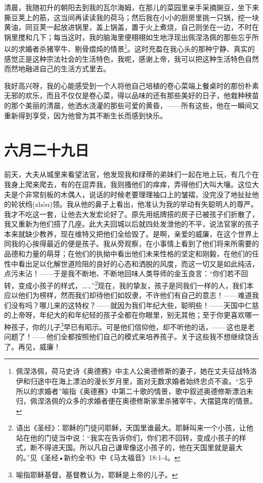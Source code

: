 \documentclass[12pt,oneside]{book}
\begin{document}
清晨，我随初升的朝阳去到我的瓦尔海姆，在那儿的菜园里亲手采摘豌豆，坐下来撕豆荚上的筋，这当间再读读我的荷马；然后我在小小的厨房里挑一只锅，挖一块黄油，同豆荚一起放进锅里，盖上锅盖，置于火上煮烧，自己则坐在一边，不时在锅里搅和几下；每当这时，我的脑海里便栩栩如生地浮现出佩涅洛佩的那些忘乎所以的求婚者杀猪宰牛、剔骨煨炖的情景\footnote{佩涅洛佩，荷马史诗《奥德赛》中主人公奥德修斯的妻子，她在丈夫征战特洛伊和归途中在海上漂泊的漫长岁月里，面对无数求婚者始终忠贞不渝。“忘乎所以的求婚者”喻指《奥德赛》中第二十歌的情景，歌中叙述奥德修斯漂泊未归，佩涅洛佩的众多的求婚者便在奥德修斯家里杀猪宰牛，大摆筵席的情景。}。这时充盈在我心头的那种宁静、真实的感觉正是这种宗法社会的生活特色，我呢，感谢上帝，我可以把这种生活特色自然而然地融进自己的生活方式里去。

我好高兴呀，我的心能感受到一个人将他自己培植的卷心菜端上餐桌时的那份朴素无邪的欢乐，而且不仅仅是卷心菜，得以品味的还有那些美好的日子，他栽种秧苗的那个美丽的清晨，他洒水浇灌的那些可爱的黄昏，——所有这些，他在一瞬间又重新得到享受，因为他曾为其不断生长而感到快乐。

\chapter{六月二十九日}
前天，大夫从城里来看望法官，他发现我和绿蒂的弟妹们一起在地上玩，有几个在我身上爬来爬去，有的在逗弄我，我则搔他们的痒痒，弄得他们大叫大嚷。这位大夫是个非常刻板的木偶人，说话的时候老要理理袖口上的皱褶，没完没了地扯扯他的轮状绉(zhòu)领。我从他的鼻子上看出，他准认为我的举动有失聪明人的尊严。我才不吃这一套，让他去大发宏论好了。原先用纸牌搭的房子已被孩子们折散了，我又重新为他们搭了几座。此大夫回城以后就四处发泄他的不平，说法官家的孩子本来就缺少教养，现在维特又把他们全给毁了。是啊，亲爱的威廉，在这个世界上同我的心挨得最近的便是孩子。我从旁观察，在小事情上看到了他们将来所需要的品德和力量的萌芽；在他们的执拗中看出他们未来性格的坚定和刚毅，在他们的任性中看出足以化解世道险阻的良好的心态和洒脱的风度，而这一切又是如此纯洁，点污未沾！——于是我不断地、不断地回味人类导师的金玉良言：“你们若不回转，变成小孩子的样式，……”\footnote{语出《圣经》：耶稣的门徒问耶稣，天国里谁最大。耶稣叫来一个小孩，让他站在他的门徒当中说：“我实在告诉你们，你们若不回转，变成小孩子的样式，断不得进天国。所以凡自己谦卑像这小孩子的，他在天国里就是最大的。”见《圣经•新约全书》中《马太福音》18:1-4。}现在，我的挚友，孩子是同我们一样的人，我们本应以他们为榜样，然而我们却待他们如奴隶，不许他们有自己的意志！——难道我们没有吗？哪儿来的这特权？——就因为我们年纪大些，聪明些！——天国中仁慈的上帝呀，年纪大的和年纪轻的孩子全都在你眼里，别无其他；至于你更喜欢哪一种孩子，你的儿子\footnote{喻指耶稣基督。基督教认为，耶稣是上帝的儿子。}早已有昭示。可是他们信仰他，却不听他的话，——这也是老问题了！——他们全都按照他们自己的模式来培养孩子。关于这些我不想继续饶舌了。再见，威廉！
\end{document}

